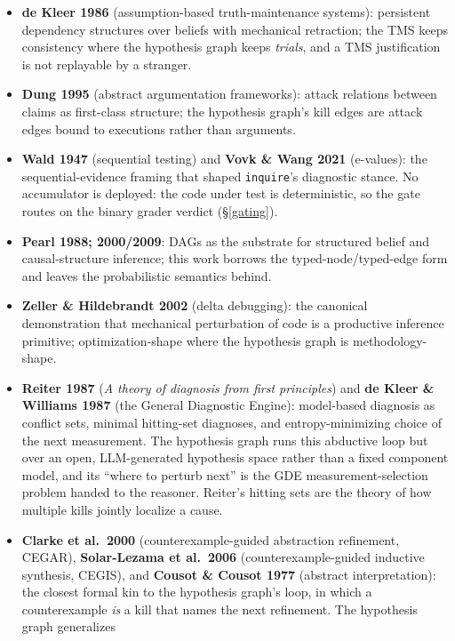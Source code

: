 \documentclass[
  10pt,
]{article}
\providecommand{\tightlist}{%
  \setlength{\itemsep}{0pt}\setlength{\parskip}{0pt}}
\begin{document}
\begin{itemize}
\tightlist
\item
  \textbf{de Kleer 1986} (assumption-based truth-maintenance systems):
  persistent dependency structures over beliefs with mechanical
  retraction; the TMS keeps consistency where the hypothesis graph keeps
  \emph{trials}, and a TMS justification is not replayable by a
  stranger.
\item
  \textbf{Dung 1995} (abstract argumentation frameworks): attack
  relations between claims as first-class structure; the hypothesis
  graph's kill edges are attack edges bound to executions rather than
  arguments.
\item
  \textbf{Wald 1947} (sequential testing) and \textbf{Vovk \& Wang 2021}
  (e-values): the sequential-evidence framing that shaped
  \texttt{inquire}'s diagnostic stance. No accumulator is deployed: the
  code under test is deterministic, so the gate routes on the binary
  grader verdict (\S\ref{gating}).
\item
  \textbf{Pearl 1988; 2000/2009}: DAGs as the substrate for structured
  belief and causal-structure inference; this work borrows the
  typed-node/typed-edge form and leaves the probabilistic semantics
  behind.
\item
  \textbf{Zeller \& Hildebrandt 2002} (delta debugging): the canonical
  demonstration that mechanical perturbation of code is a productive
  inference primitive; optimization-shape where the hypothesis graph is
  methodology-shape.
\item
  \textbf{Reiter 1987} (\emph{A theory of diagnosis from first
  principles}) and \textbf{de Kleer \& Williams 1987} (the General
  Diagnostic Engine): model-based diagnosis as conflict sets, minimal
  hitting-set diagnoses, and entropy-minimizing choice of the next
  measurement. The hypothesis graph runs this abductive loop but over an
  open, LLM-generated hypothesis space rather than a fixed component
  model, and its ``where to perturb next'' is the GDE
  measurement-selection problem handed to the reasoner. Reiter's hitting
  sets are the theory of how multiple kills jointly localize a cause.
\item
  \textbf{Clarke et al.~2000} (counterexample-guided abstraction
  refinement, CEGAR), \textbf{Solar-Lezama et al.~2006}
  (counterexample-guided inductive synthesis, CEGIS), and \textbf{Cousot
  \& Cousot 1977} (abstract interpretation): the closest formal kin to
  the hypothesis graph's loop, in which a counterexample \emph{is} a
  kill that names the next refinement. The hypothesis graph generalizes

\end{itemize}
\end{document}
